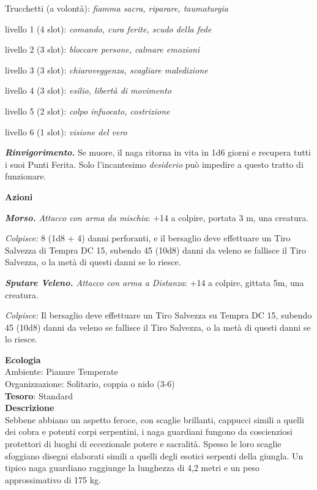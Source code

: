 \begin{multicols}{2}
Trucchetti (a volontà): \textit{fiamma sacra, riparare, taumaturgia}

livello 1 (4 slot): \textit{comando, cura ferite, scudo della fede}

livello 2 (3 slot): \textit{bloccare persone, calmare emozioni}

livello 3 (3 slot): \textit{chiaroveggenza, scagliare maledizione}

livello 4 (3 slot): \textit{esilio, libertà di movimento}

livello 5 (2 slot): \textit{colpo infuocato, costrizione}

livello 6 (1 slot): \textit{visione del vero}

\textit{\textbf{Rinvigorimento.}} Se muore, il naga ritorna in vita in 1d6 giorni e recupera tutti i suoi Punti Ferita. Solo l'incantesimo \textit{desiderio} può impedire a questo tratto di funzionare.

\textbf{Azioni}

\textit{\textbf{Morso.} Attacco con arma da mischia}: +14 a colpire, portata 3 m, una creatura.

\textit{Colpisce:} 8 (1d8 + 4) danni perforanti, e il bersaglio deve effettuare un Tiro Salvezza di Tempra DC 15, subendo 45 (10d8) danni da veleno se fallisce il Tiro Salvezza, o la metà di questi danni se lo riesce.

\textit{\textbf{Sputare Veleno.} Attacco con arma a Distanza}: +14 a colpire, gittata 5m, una creatura.

\textit{Colpisce:} Il bersaglio deve effettuare un Tiro Salvezza su Tempra DC 15, subendo 45 (10d8) danni da veleno se fallisce il Tiro Salvezza, o la metà di questi danni se lo riesce.

\textbf{Ecologia}\\
Ambiente: Pianure Temperate\\
Organizzazione: Solitario, coppia o nido (3-6)\\
\textbf{Tesoro}: Standard\\
\textbf{Descrizione}\\
Sebbene abbiano un aspetto feroce, con scaglie brillanti, cappucci simili a quelli dei cobra e potenti corpi serpentini, i naga guardiani fungono da coscienziosi protettori di luoghi di eccezionale potere e sacralità. Spesso le loro scaglie sfoggiano disegni elaborati simili a quelli degli esotici serpenti della giungla. Un tipico naga guardiano raggiunge la lunghezza di 4,2 metri e un peso approssimativo di 175 kg.


\end{multicols}
